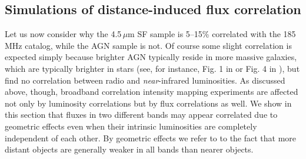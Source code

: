 \documentclass[numberedappendix]{emulateapj}
\providecommand{\DIFadd}[1]{{\protect\color{blue}\uwave{#1}}} %
\providecommand{\DIFaddbegin}{} %
\providecommand{\DIFaddend}{} %
\begin{document}
\subsection{Simulations of distance-induced flux correlation}
\label{sec:fluxcorsims}
Let us now consider why the 4.5\,$\mu$m SF sample is 5--15\% correlated with the 185\,MHz catalog, while the AGN sample is not. Of course some slight correlation is expected simply because brighter AGN typically reside in more massive galaxies, which are typically brighter in stars (see, for instance, Fig. 1 in \citep{seymour07} or Fig. 4 in \citep{Willott03}), but \citet{mauch07} find no \DIFaddbegin \DIFadd{strong }\DIFaddend correlation between radio and \textit{near}-infrared luminosities. As discussed above, though, broadband correlation intensity mapping experiments are affected not only by luminosity correlations but by flux correlations as well. We show in this section that fluxes in two different bands may appear correlated due to geometric effects even when their intrinsic luminosities are completely independent of each other. By geometric effects we refer to to the fact that more distant objects are generally weaker in all bands than nearer objects. 
\end{document}
